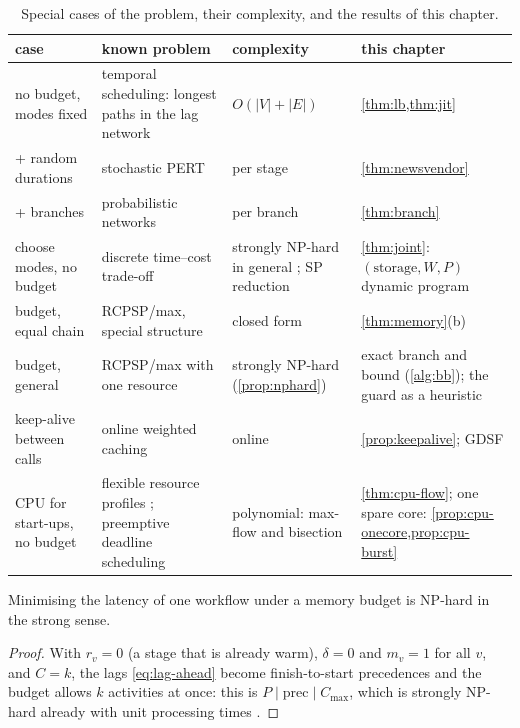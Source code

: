 \begin{table}[t]
\centering
\caption{Special cases of the problem, their complexity, and the results of this chapter.}
\label{tab:cases}
\small
\begin{tabular}{@{}p{}p{}p{}p{}@{}}
\toprule
case & known problem & complexity & this chapter \\
\midrule
no budget, modes fixed & temporal scheduling: longest paths in the lag network &
  $O(|V| + |E|)$ & \cref{thm:lb,thm:jit} \\
+ random durations & stochastic PERT & per stage & \cref{thm:newsvendor} \\
+ branches & probabilistic networks & per branch & \cref{thm:branch} \\
choose modes, no budget & discrete time--cost trade-off & strongly NP-hard in general
  \cite{de1997}; SP reduction \cite{demeulemeester1996} & \cref{thm:joint}: $(\text{storage}, W,
  P)$ dynamic program \\
budget, equal chain & RCPSP/max, special structure & closed form & \cref{thm:memory}(b) \\
budget, general & RCPSP/max with one resource & strongly NP-hard (\cref{prop:nphard}) &
  exact branch and bound (\cref{alg:bb}); the guard as a heuristic \\
keep-alive between calls & online weighted caching & online & \cref{prop:keepalive}; GDSF
  \cite{cherkasova1998,faascache2021} \\
CPU for start-ups, no budget & flexible resource profiles \cite{naber2014}; preemptive deadline
  scheduling \cite{horn1974} & polynomial: max-flow and bisection & \cref{thm:cpu-flow}; one
  spare core: \cref{prop:cpu-onecore,prop:cpu-burst} \\
\bottomrule
\end{tabular}
\end{table}

\begin{proposition}[Hardness]
\label{prop:nphard}
Minimising the latency of one workflow under a memory budget is NP-hard in the strong sense.
\end{proposition}

\begin{proof}
With $r_v = 0$ (a stage that is already warm), $\delta = 0$ and $m_v = 1$ for all $v$, and
$C = k$, the lags \eqref{eq:lag-ahead} become finish-to-start precedences and the budget allows
$k$ activities at once: this is $P \mid \mathrm{prec} \mid C_{\max}$, which is strongly NP-hard
already with unit processing times \cite{ullman1975}.
\end{proof}


